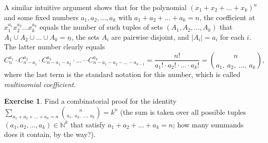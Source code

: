 \documentclass[12pt,notitlepage]{article}
\theoremstyle{plain}
\theoremstyle{definition}
\newtheorem{exc}[thm]{Exercise}
\theoremstyle{plain}
\newcommand{\N}{\mathbb{N}}
\newcommand{\ul}[1]{\underline{#1}}
\newcommand{\1}{\mathbf{1}}
\newcommand{\0}{\mathbf{0}}
\begin{document}
A similar intuitive argument shows that for the polynomial $(x_1 + x_2 + \ldots + x_k)^n$ and some fixed numbers $a_1, a_2, \ldots, a_k$ with $a_1 + a_2 + \ldots + a_k = n$, the coefficient at $x_1^{a_1} x_2^{a_2} \ldots x_k^{a_k}$ equals the number of such tuples of sets $(A_1, A_2, \ldots, A_k)$ that $A_1 \cup A_2 \cup \ldots \cup A_k = \ul{n}$, the sets $A_i$ are pairwise disjoint, and $|A_i| = a_i$ for each $i$. The latter number clearly equals
$$C_n^{a_1} \cdot C_{n - {a_1}}^{a_2} \cdot C_{n - {a_1} - {a_2}}^{a_3} \cdot \ldots \cdot \cdot C_{n - {a_1} - {a_2} - \ldots - {a_{k-1}}}^{a_k} = \dfrac{n!} {a_1! \cdot a_2! \cdot \ldots \cdot a_k!} = \binom{n}{a_1,\ a_2,\ \ldots,\ a_k},$$
where the last term is the standard notation for this number, which is called \emph{multinomial coefficient}.

\begin{exc}
Find a combinatorial proof for the identity $\sum\limits_{a_1 + a_2 + \ldots + a_k = n} \binom{n}{a_1,\ a_2,\ \ldots,\ a_k} = k^n$ (the sum is taken over all possible tuples $(a_1, a_2, \ldots, a_k) \in \N^k$ that satisfy $a_1 + a_2 + \ldots + a_k = n$; how many summands does it contain, by the way?).
\end{exc}
\end{document}
